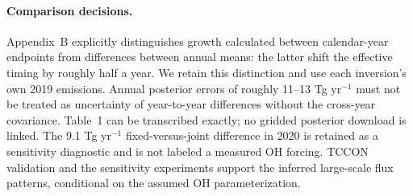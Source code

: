 \documentclass[11pt]{article}
\begin{document}
\paragraph{Comparison decisions.}
Appendix~B explicitly distinguishes growth calculated between calendar-year
endpoints from differences between annual means: the latter shift the
effective timing by roughly half a year. We retain this distinction and
use each inversion's own 2019 emissions. Annual posterior errors of
roughly 11--13 Tg yr$^{-1}$ must not be treated as uncertainty of
year-to-year differences without the cross-year covariance. Table~1
can be transcribed exactly; no gridded posterior download is linked.
The 9.1 Tg yr$^{-1}$ fixed-versus-joint difference in 2020 is retained
as a sensitivity diagnostic and is not labeled a measured OH forcing.
TCCON validation and the sensitivity experiments support the inferred
large-scale flux patterns, conditional on the assumed OH parameterization.
\end{document}
